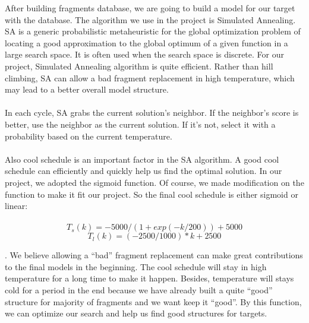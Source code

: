 \documentclass{article}
\begin{document}
After building fragments database, we are going to build a model for our target with the database. The algorithm we use in the project is Simulated Annealing. SA is a generic probabilistic metaheuristic for the global optimization problem of locating a good approximation to the global optimum of a given function in a large search space. It is often used when the search space is discrete. For our project, Simulated Annealing algorithm is quite efficient. Rather than hill climbing, SA can allow a bad fragment replacement in high temperature, which may lead to a better overall model structure. \\\\
In each cycle, SA grabs the current solution’s neighbor. If the neighbor’s score is better, use
the neighbor as the current solution. If it’s not, select it with a probability based on the current temperature.\\\\
     Also cool schedule is an important factor in the SA algorithm. A good cool schedule can efficiently and quickly help us find the optimal solution. In our project, we adopted the sigmoid function. Of course, we made modification on the function to make it fit our project. So the final cool schedule is either sigmoid or linear:\\\\
\begin{equation*}
      T_s(k) =  -5000/(1+ exp(-k/200))+5000
    \end{equation*}
\begin{equation*}
      T_l(k) =  (-2500/1000)*k + 2500
    \end{equation*}

. We believe allowing a “bad” fragment replacement can make great contributions to the final models in the beginning. The cool schedule will stay in high temperature for a long time to make it happen. Besides, temperature will stays cold for a period in the end because we have already built a quite “good” structure for majority of fragments and we want keep it “good”. By this function, we can optimize our search and help us find good structures for targets.
\end{document}
